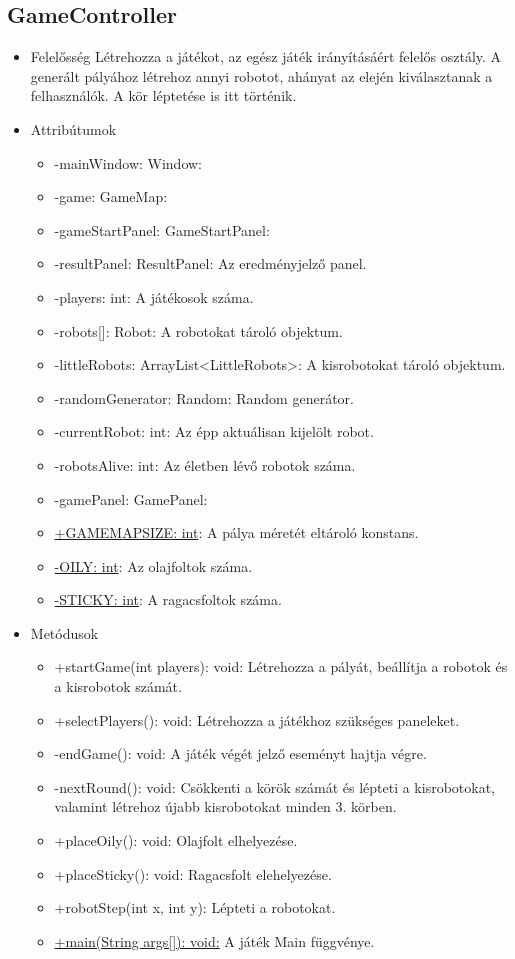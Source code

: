 
\subsection{GameController}
\begin{itemize}
	\item Felelősség\newline
	Létrehozza a játékot, az egész játék irányításáért felelős osztály. A generált pályához létrehoz annyi robotot, ahányat az elején kiválasztanak a felhasználók. A kör léptetése is itt történik.
	
	\item Attribútumok\newline

	\begin{itemize}
		\item -mainWindow: Window: 
		\item -game: GameMap:
		\item -gameStartPanel: GameStartPanel:
		\item -resultPanel: ResultPanel: Az eredményjelző panel.
		\item -players: int: A játékosok száma.
		\item -robots[]: Robot: A robotokat tároló objektum.
		\item -littleRobots: ArrayList<LittleRobots>: A kisrobotokat tároló objektum. 
		\item -randomGenerator: Random: Random generátor.
		\item -currentRobot: int: Az épp aktuálisan kijelölt robot.
		\item -robotsAlive: int: Az életben lévő robotok száma.
		\item -gamePanel: GamePanel: 
		\item \underline{+GAMEMAPSIZE: int}: A pálya méretét eltároló konstans.
		\item \underline{-OILY: int}: Az olajfoltok száma.
		\item \underline{-STICKY: int}: A ragacsfoltok száma.
		\end{itemize}
	\item Metódusok\newline
	\begin{itemize}
		\item +startGame(int players): void: Létrehozza a pályát, beállítja a robotok és a kisrobotok számát. 
		\item +selectPlayers(): void: Létrehozza a játékhoz szükséges paneleket.
		\item -endGame(): void: A játék végét jelző eseményt hajtja végre.
		\item -nextRound(): void: Csökkenti a körök számát és lépteti a kisrobotokat, valamint létrehoz újabb kisrobotokat minden 3. körben.
		\item +placeOily(): void: Olajfolt elhelyezése. 
		\item +placeSticky(): void: Ragacsfolt elehelyezése.
		\item +robotStep(int x, int y): Lépteti a robotokat.
		\item \underline{+main(String args[]): void:} A játék Main függvénye.
	\end{itemize}
\end{itemize}

